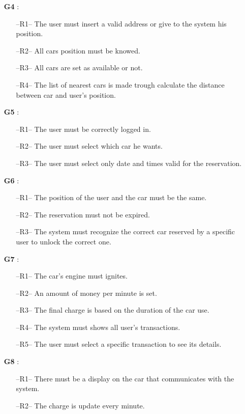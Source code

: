 \begin{itemize}
\item[\textbf{G4}]:
\begin{itemize}
\item[--R1--] The user must insert a valid address or give to the system his position.
\item[--R2--] All cars position must be knowed.
\item[--R3--] All cars are set as available or not.
\item[--R4--] The list of nearest cars is made trough calculate the distance between car and user's position.
\end{itemize}

\item[\textbf{G5}]:
\begin{itemize}
\item[--R1--] The user must be correctly logged in.
\item[--R2--] The user must select which car he wants.
\item[--R3--] The user must select only date and times valid for the reservation.
\end{itemize}

\item[\textbf{G6}]:
\begin{itemize}
\item[--R1--] The position of the user and the car must be the same.
\item[--R2--] The reservation must not be expired.
\item[--R3--] The system must recognize the correct car reserved by a specific user to unlock the correct one.
\end{itemize}

\item[\textbf{G7}]:
\begin{itemize}
\item[--R1--] The car's engine must ignites.
\item[--R2--] An amount of money per minute is set.
\item[--R3--] The final charge is based on the duration of the car use.
\item[--R4--] The system must shows all user's transactions.
\item[--R5--] The user must select a specific transaction to see its details.
\end{itemize}

\item[\textbf{G8}]:
\begin{itemize}
\item[--R1--] There must be a display on the car that communicates with the system.
\item[--R2--] The charge is update every minute.
\end{itemize}


\end{itemize}
